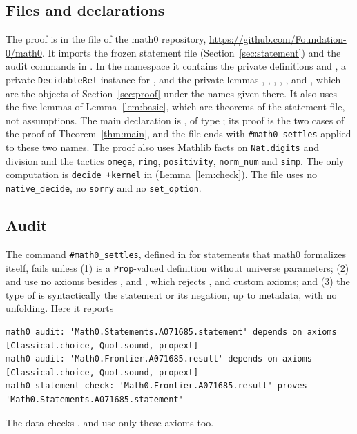 \documentclass[11pt]{amsart}
\theoremstyle{plain}
\theoremstyle{definition}
\begin{document}
\subsection*{Files and declarations}
The proof is in the file  of the math0 repository, \url{https://github.com/Foundation-0/math0}. It imports the frozen statement file  (Section~\ref{sec:statement}) and the audit commands in . In the namespace  it contains the private definitions  and , a private \texttt{DecidableRel} instance for , and the private lemmas , , , , ,  and , which are the objects of Section~\ref{sec:proof} under the names given there. It also uses the five lemmas of Lemma~\ref{lem:basic}, which are theorems of the statement file, not assumptions. The main declaration is , of type ; its proof is the two cases of the proof of Theorem~\ref{thm:main}, and the file ends with \texttt{\#math0\_settles} applied to these two names. The proof also uses Mathlib facts on \texttt{Nat.digits} and division and the tactics \texttt{omega}, \texttt{ring}, \texttt{positivity}, \texttt{norm\_num} and \texttt{simp}. The only computation is \texttt{decide +kernel} in  (Lemma~\ref{lem:check}). The file uses no \texttt{native\_decide}, no \texttt{sorry} and no \texttt{set\_option}.

\subsection*{Audit}
The command \texttt{\#math0\_settles}, defined in  for statements that math0 formalizes itself, fails unless (1)  is a \texttt{Prop}-valued definition without universe parameters; (2)  and  use no axioms besides ,  and , which rejects ,  and custom axioms; and (3) the type of  is syntactically the statement or its negation, up to metadata, with no unfolding. Here it reports
\begin{lstlisting}[basicstyle=\ttfamily\scriptsize]
math0 audit: 'Math0.Statements.A071685.statement' depends on axioms [Classical.choice, Quot.sound, propext]
math0 audit: 'Math0.Frontier.A071685.result' depends on axioms [Classical.choice, Quot.sound, propext]
math0 statement check: 'Math0.Frontier.A071685.result' proves 'Math0.Statements.A071685.statement'
\end{lstlisting}
The data checks ,  and  use only these axioms too.
\end{document}
